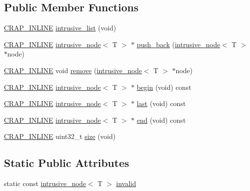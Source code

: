\subsection*{Public Member Functions}
\begin{DoxyCompactItemize}
\item 
\hyperlink{config__x86_8h_a5a40526b8d842e7ff731509998bb0f1c}{C\+R\+A\+P\+\_\+\+I\+N\+L\+I\+N\+E} \hyperlink{singletoncrap_1_1intrusive__list_a3eb29c7fc0e511940c5a6bf6def09bc6}{intrusive\+\_\+list} (void)
\item 
\hyperlink{config__x86_8h_a5a40526b8d842e7ff731509998bb0f1c}{C\+R\+A\+P\+\_\+\+I\+N\+L\+I\+N\+E} \hyperlink{classcrap_1_1intrusive__node}{intrusive\+\_\+node}$<$ T $>$ $\ast$ \hyperlink{singletoncrap_1_1intrusive__list_a6cb852c53ba71a4e891738aace985e8e}{push\+\_\+back} (\hyperlink{classcrap_1_1intrusive__node}{intrusive\+\_\+node}$<$ T $>$ $\ast$node)
\item 
\hyperlink{config__x86_8h_a5a40526b8d842e7ff731509998bb0f1c}{C\+R\+A\+P\+\_\+\+I\+N\+L\+I\+N\+E} void \hyperlink{singletoncrap_1_1intrusive__list_aa82242df86538f8a2f41a4f21b7f5227}{remove} (\hyperlink{classcrap_1_1intrusive__node}{intrusive\+\_\+node}$<$ T $>$ $\ast$node)
\item 
\hyperlink{config__x86_8h_a5a40526b8d842e7ff731509998bb0f1c}{C\+R\+A\+P\+\_\+\+I\+N\+L\+I\+N\+E} \hyperlink{classcrap_1_1intrusive__node}{intrusive\+\_\+node}$<$ T $>$ $\ast$ \hyperlink{singletoncrap_1_1intrusive__list_a1e3a33e52f9376255e2a74ec3fbe1f61}{begin} (void) const 
\item 
\hyperlink{config__x86_8h_a5a40526b8d842e7ff731509998bb0f1c}{C\+R\+A\+P\+\_\+\+I\+N\+L\+I\+N\+E} \hyperlink{classcrap_1_1intrusive__node}{intrusive\+\_\+node}$<$ T $>$ $\ast$ \hyperlink{singletoncrap_1_1intrusive__list_afebe2ecdc59189f6ae3a944d647be6cd}{last} (void) const 
\item 
\hyperlink{config__x86_8h_a5a40526b8d842e7ff731509998bb0f1c}{C\+R\+A\+P\+\_\+\+I\+N\+L\+I\+N\+E} \hyperlink{classcrap_1_1intrusive__node}{intrusive\+\_\+node}$<$ T $>$ $\ast$ \hyperlink{singletoncrap_1_1intrusive__list_a7d5848faf582d03caa71dce551c9ba60}{end} (void) const 
\item 
\hyperlink{config__x86_8h_a5a40526b8d842e7ff731509998bb0f1c}{C\+R\+A\+P\+\_\+\+I\+N\+L\+I\+N\+E} uint32\+\_\+t \hyperlink{singletoncrap_1_1intrusive__list_ab1878553d19f6d17bb86f4231ada31d6}{size} (void)
\end{DoxyCompactItemize}
\subsection*{Static Public Attributes}
\begin{DoxyCompactItemize}
\item 
static const \hyperlink{classcrap_1_1intrusive__node}{intrusive\+\_\+node}$<$ T $>$ \hyperlink{singletoncrap_1_1intrusive__list_affcf3ee51491ee20c6e7790951f33774}{invalid}
\end{DoxyCompactItemize}


